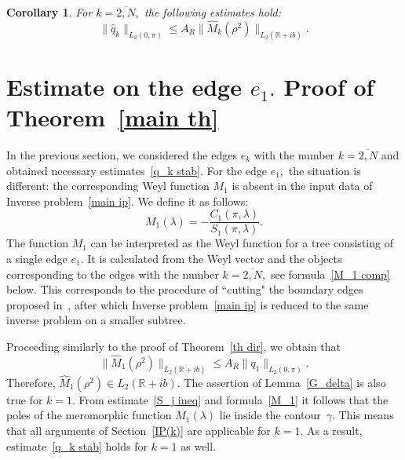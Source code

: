 \documentclass[a4paper, 12pt] {article}
\theoremstyle{plain}
\newtheorem{corollary}{\indent Corollary}
\theoremstyle{remark}
\theoremstyle{plain}
\theoremstyle{definition}
\numberwithin{equation}{section}
\begin{document}
\begin{corollary} For $k=\overline{2, N},$ the following estimates hold:
\begin{equation} \label{q_k stab}
\| \hat q_k \|_{L_2(0, \pi)} \le A_R \| \hat M_k(\rho^2)\|_{L_2({\mathbb R}+ib)}.
\end{equation}
\end{corollary}

\label{IP(k)}


\section{Estimate on the edge $e_1.$ Proof of Theorem~\ref{main th}}
\label{final}

In the previous section, we considered the edges $e_k$ with the number $k=\overline{2, N}$ and obtained necessary estimates~\eqref{q_k stab}.
For the edge $e_1,$ the situation is different: the corresponding Weyl function $M_1$ is absent in the input data of Inverse problem~\ref{main ip}.
We define it as follows:
\begin{equation}\label{M_1}
M_1(\lambda) = -\frac{C_1(\pi, \lambda)}{S_1(\pi, \lambda)}.
\end{equation}
The function $M_1$ can be interpreted as the Weyl function for a tree consisting of a single edge $e_1.$
It is calculated from the Weyl vector and the objects corresponding to the edges with the number $k=\overline{2, N},$ see formula~\eqref{M_1 comp} below. This corresponds to the procedure of  ``cutting" the boundary edges proposed in~\cite{yurko2005}, after which Inverse problem~\ref{main ip} is reduced to the same inverse problem on a smaller subtree.

Proceeding similarly to the proof of Theorem~\ref{th dir}, we obtain that
$$\| \hat M_1(\rho^2)\|_{L_2(\mathbb R + ib)} \le A_R \| q_1\|_{L_2(0, \pi)}. $$
Therefore, $\hat M_1(\rho^2) \in L_2(\mathbb R + ib).$
The assertion of Lemma~\ref{G_delta} is also true for $k=1.$
From estimate~\eqref{S_j ineq} and formula~\eqref{M_1} it follows that the poles of the meromorphic function $M_1(\lambda)$ lie inside the contour~$\gamma.$ This means that all arguments of Section~\ref{IP(k)} are applicable for $k=1.$
As a result, estimate~\eqref{q_k stab} holds for $k=1$ as well.
\end{document}
